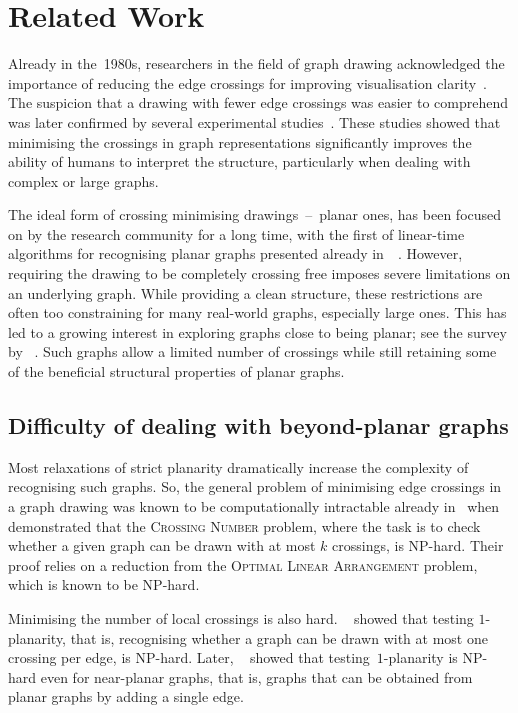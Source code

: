 \chapter{Related Work}\label{ch:related-work}

Already in the~1980s, researchers in the field of graph drawing acknowledged the importance of reducing the edge crossings for improving visualisation clarity~\cite{early-few-crossing}. The suspicion that a drawing with fewer edge crossings was easier to comprehend was later confirmed by several experimental studies~\cite{graph-aesthetic-survey}. These studies showed that minimising the crossings in graph representations significantly improves the ability of humans to interpret the structure, particularly when dealing with complex or large graphs.

The ideal form of crossing minimising drawings~--~planar ones, has been focused on by the research community for a long time, with the first of linear-time algorithms for recognising planar graphs presented already in~\citeyear{linear-p}~\cite{linear-p}. However, requiring the drawing to be completely crossing free imposes severe limitations on an underlying graph. While providing a clean structure, these restrictions are often too constraining for many real-world graphs, especially large ones. This has led to a growing interest in exploring graphs close to being planar; see the survey by \citeauthor{beyond-planarity-survey}~\cite{beyond-planarity-survey}. Such graphs allow a limited number of crossings while still retaining some of the beneficial structural properties of planar graphs.


\section{Difficulty of dealing with beyond-planar graphs}

Most relaxations of strict planarity dramatically increase the complexity of recognising such graphs. So, the general problem of minimising edge crossings in a graph drawing was known to be computationally intractable already in~\citeyear{cr_NPC} when \citeauthor{cr_NPC}~\cite{cr_NPC} demonstrated that the \textsc{Crossing Number} problem, where the task is to check whether a given graph can be drawn with at most \(k\) crossings, is NP-hard. Their proof relies on a reduction from the \textsc{Optimal Linear Arrangement} problem, which is known to be NP-hard.

Minimising the number of local crossings is also hard. \citeauthor{1p-NPH}~\cite{1p-NPH} showed that testing \(1\)-planarity, that is, recognising whether a graph can be drawn with at most one crossing per edge, is NP-hard. Later, \citeauthor{one-edge-NPH}~\cite{one-edge-NPH} showed that testing~\(1\)-planarity is NP-hard even for near-planar graphs, that is, graphs that can be obtained from planar graphs by adding a single edge.

